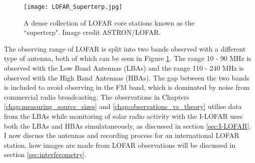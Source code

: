  
\begin{figure}
\centering
\texttt{[image: LOFAR\_Superterp.jpg]}
\caption[The LOFAR superterp]{A dense collection of LOFAR core stations known as the ``superterp". Image credit ASTRON/LOFAR.}
\label{fig:superterp}
\end{figure}

The observing range of LOFAR is split into two bands observed with a different type of antenna, both of which can be seen in Figure \ref{fig:superterp}. The range 10 - 90 MHz is observed with the Low Band Antennas (LBAs) and the range 110 - 240 MHz is observed with the High Band Antennas (HBAs). The gap between the two bands is included to avoid observing in the FM band, which is dominated by noise from commercial radio broadcasting. The observations in Chapters \ref{chap:measuring_source_sizes} and \ref{chap:observations_vs_theory} utilise data from the LBAs while monitoring of solar radio activity with the I-LOFAR uses both the LBAs and HBAs simulataneously, as discussed in section \ref{sec:I-LOFAR}. I now discuss the antennas and recording process for an international LOFAR station, how images are made from LOFAR observations will be discussed in section \ref{sec:interferometry}.
